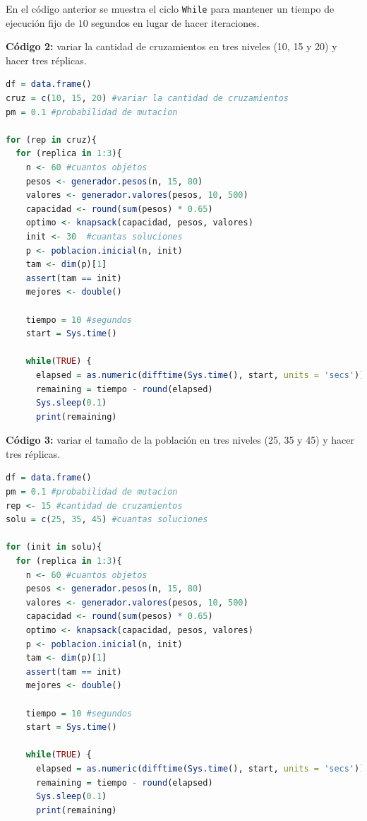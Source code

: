 \documentclass{article}
\begin{document}
En el código anterior se muestra el ciclo \texttt{While} para mantener un tiempo de ejecución fijo de $10$ segundos en lugar de hacer iteraciones.
\bigskip

\textbf{Código 2:} variar la cantidad de cruzamientos en tres niveles (10, 15 y 20) y hacer tres réplicas.

\lstset{style=mystyle}
\begin{lstlisting}[language=R, caption= Fragemento del código para variar la cantidad de cruzamientos en tres niveles.]
df = data.frame()
cruz = c(10, 15, 20) #variar la cantidad de cruzamientos
pm = 0.1 #probabilidad de mutacion

for (rep in cruz){
  for (replica in 1:3){
    n <- 60 #cuantos objetos
    pesos <- generador.pesos(n, 15, 80)
    valores <- generador.valores(pesos, 10, 500)
    capacidad <- round(sum(pesos) * 0.65)
    optimo <- knapsack(capacidad, pesos, valores)
    init <- 30  #cuantas soluciones
    p <- poblacion.inicial(n, init)
    tam <- dim(p)[1]
    assert(tam == init)
    mejores <- double()
    
    tiempo = 10 #segundos
    start = Sys.time()
    
    while(TRUE) {
      elapsed = as.numeric(difftime(Sys.time(), start, units = 'secs'))
      remaining = tiempo - round(elapsed) 
      Sys.sleep(0.1)
      print(remaining)
\end{lstlisting}

\textbf{Código 3:} variar el tamaño de la población en tres niveles (25, 35 y 45) y hacer tres réplicas.

\lstset{style=mystyle}
\begin{lstlisting}[language=R, caption= Fragemento del código para variar el tamaño de la población en tres niveles.]
df = data.frame()
pm = 0.1 #probabilidad de mutacion
rep <- 15 #cantidad de cruzamientos
solu = c(25, 35, 45) #cuantas soluciones

for (init in solu){
  for (replica in 1:3){
    n <- 60 #cuantos objetos
    pesos <- generador.pesos(n, 15, 80)
    valores <- generador.valores(pesos, 10, 500)
    capacidad <- round(sum(pesos) * 0.65)
    optimo <- knapsack(capacidad, pesos, valores)
    p <- poblacion.inicial(n, init)
    tam <- dim(p)[1]
    assert(tam == init)
    mejores <- double()
    
    tiempo = 10 #segundos
    start = Sys.time()
    
    while(TRUE) {
      elapsed = as.numeric(difftime(Sys.time(), start, units = 'secs'))
      remaining = tiempo - round(elapsed) 
      Sys.sleep(0.1)
      print(remaining)
\end{lstlisting}
\end{document}
